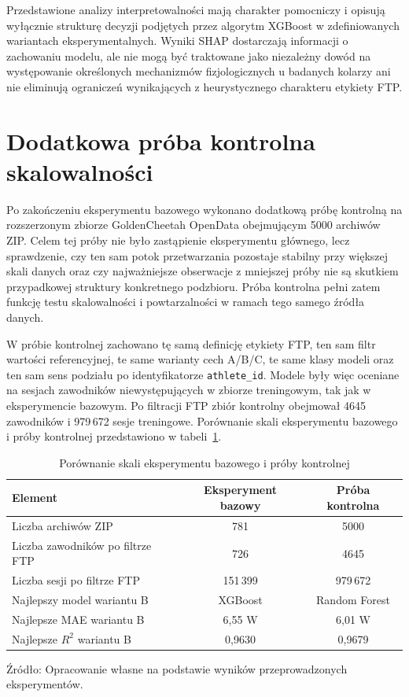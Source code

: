 Przedstawione analizy interpretowalności mają charakter pomocniczy i opisują wyłącznie strukturę decyzji podjętych przez algorytm XGBoost w zdefiniowanych wariantach eksperymentalnych. Wyniki SHAP dostarczają informacji o zachowaniu modelu, ale nie mogą być traktowane jako niezależny dowód na występowanie określonych mechanizmów fizjologicznych u badanych kolarzy ani nie eliminują ograniczeń wynikających z heurystycznego charakteru etykiety FTP.

\FloatBarrier
\section{Dodatkowa próba kontrolna skalowalności}
\label{sec:control_5000_scalability}

Po zakończeniu eksperymentu bazowego wykonano dodatkową próbę kontrolną na rozszerzonym zbiorze GoldenCheetah OpenData obejmującym 5000 archiwów ZIP. Celem tej próby nie było zastąpienie eksperymentu głównego, lecz sprawdzenie, czy ten sam potok przetwarzania pozostaje stabilny przy większej skali danych oraz czy najważniejsze obserwacje z mniejszej próby nie są skutkiem przypadkowej struktury konkretnego podzbioru. Próba kontrolna pełni zatem funkcję testu skalowalności i powtarzalności w ramach tego samego źródła danych.

W próbie kontrolnej zachowano tę samą definicję etykiety FTP, ten sam filtr wartości referencyjnej, te same warianty cech A/B/C, te same klasy modeli oraz ten sam sens podziału po identyfikatorze \texttt{athlete\_id}. Modele były więc oceniane na sesjach zawodników niewystępujących w zbiorze treningowym, tak jak w eksperymencie bazowym. Po filtracji FTP zbiór kontrolny obejmował 4645 zawodników i 979\,672 sesje treningowe. Porównanie skali eksperymentu bazowego i próby kontrolnej przedstawiono w tabeli~\ref{tab:baseline_control_scale}.

\begin{table}[!htbp]
\centering
\caption{Porównanie skali eksperymentu bazowego i próby kontrolnej}
\label{tab:baseline_control_scale}
\small
\begin{tabular}{|>{\raggedright\arraybackslash}p{4.4cm}|c|c|}
\hline
\textbf{Element} & \textbf{Eksperyment bazowy} & \textbf{Próba kontrolna} \\ \hline
Liczba archiwów ZIP & 781 & 5000 \\ \hline
Liczba zawodników po filtrze FTP & 726 & 4645 \\ \hline
Liczba sesji po filtrze FTP & 151\,399 & 979\,672 \\ \hline
Najlepszy model wariantu B & XGBoost & Random Forest \\ \hline
Najlepsze MAE wariantu B & 6{,}55 W & 6{,}01 W \\ \hline
Najlepsze $R^2$ wariantu B & 0{,}9630 & 0{,}9679 \\ \hline
\end{tabular}
\par\smallskip
\raggedright\footnotesize Źródło: Opracowanie własne na podstawie wyników przeprowadzonych eksperymentów.
\end{table}

